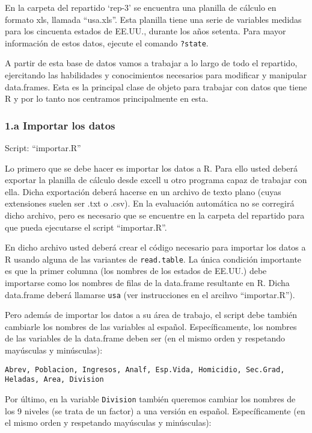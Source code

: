 \documentclass[]{article}
\begin{document}
En la carpeta del repartido `rep-3' se encuentra una planilla de cálculo
en formato xls, llamada ``usa.xls''. Esta planilla tiene una serie de
variables medidas para los cincuenta estados de EE.UU., durante los años
setenta. Para mayor información de estos datos, ejecute el comando
\texttt{?state}.

A partir de esta base de datos vamos a trabajar a lo largo de todo el
repartido, ejercitando las habilidades y conocimientos necesarios para
modificar y manipular data.frames. Esta es la principal clase de objeto
para trabajar con datos que tiene R y por lo tanto nos centramos
principalmente en esta.

\subsubsection{1.a Importar los datos}

Script: ``importar.R''

Lo primero que se debe hacer es importar los datos a R. Para ello usted
deberá exportar la planilla de cálculo desde excell u otro programa
capaz de trabajar con ella. Dicha exportación deberá hacerse en un
archivo de texto plano (cuyas extensiones suelen ser .txt o .csv). En la
evaluación automática no se corregirá dicho archivo, pero es necesario
que se encuentre en la carpeta del repartido para que pueda ejecutarse
el script ``importar.R''.

En dicho archivo usted deberá crear el código necesario para importar
los datos a R usando alguna de las variantes de \texttt{read.table}. La
única condición importante es que la primer columna (los nombres de los
estados de EE.UU.) debe importarse como los nombres de filas de la
data.frame resultante en R. Dicha data.frame deberá llamarse
\texttt{usa} (ver instrucciones en el arcihvo ``importar.R'').

Pero además de importar los datos a su área de trabajo, el script debe
también cambiarle los nombres de las variables al español.
Específicamente, los nombres de las variables de la data.frame deben ser
(en el mismo orden y respetando mayúsculas y minúsculas):

\begin{verbatim}
Abrev, Poblacion, Ingresos, Analf, Esp.Vida, Homicidio, Sec.Grad, 
Heladas, Area, Division
\end{verbatim}
Por último, en la variable \texttt{Division} también queremos cambiar
los nombres de los 9 niveles (se trata de un factor) a una versión en
español. Específicamente (en el mismo orden y respetando mayúsculas y
minúsculas):
\end{document}
